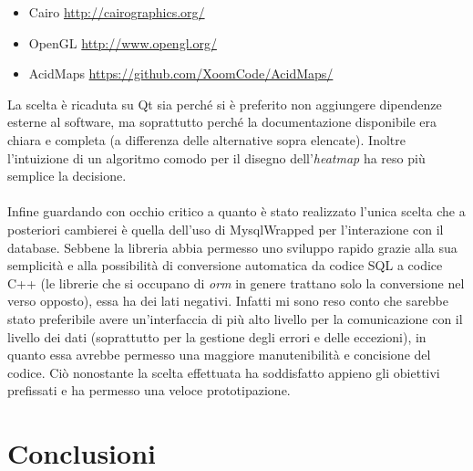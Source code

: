 \documentclass[a4paper,13pt,twoside]{article}
\begin{document}
\begin{itemize}
	\item Cairo \url{http://cairographics.org/}
	\item OpenGL \url{http://www.opengl.org/}
	\item AcidMaps \url{https://github.com/XoomCode/AcidMaps/}
\end{itemize}
La scelta è ricaduta su Qt sia perché si è preferito non aggiungere dipendenze esterne al software, ma soprattutto perché la documentazione disponibile era chiara e completa (a differenza delle alternative sopra elencate). Inoltre l'intuizione di un algoritmo comodo per il disegno  dell'\textit{heatmap} ha reso più semplice la decisione. \\ \\
Infine guardando con occhio critico a quanto è stato realizzato l'unica scelta che a posteriori cambierei è quella dell'uso di MysqlWrapped per l'interazione con il database. Sebbene la libreria abbia permesso uno sviluppo rapido grazie alla sua semplicità e alla possibilità di conversione automatica da codice SQL a codice C++ (le librerie che si occupano di \textit{orm} in genere trattano solo la conversione nel verso opposto), essa ha dei lati negativi. Infatti mi sono reso conto che sarebbe stato preferibile avere un'interfaccia di più alto livello per la comunicazione con il livello dei dati (soprattutto per la gestione degli errori e delle eccezioni), in quanto essa avrebbe permesso una maggiore manutenibilità e concisione del codice. Ciò nonostante la scelta effettuata ha soddisfatto appieno gli obiettivi prefissati e ha permesso una veloce prototipazione.

\newpage
\section{Conclusioni}

\newpage

%
%


%

\appendix
%
%
%
\end{document}
